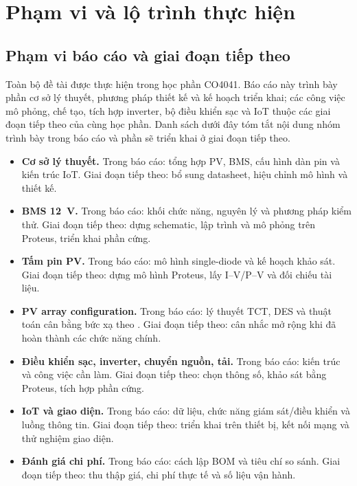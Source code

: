 \section{Phạm vi và lộ trình thực hiện}

\subsection{Phạm vi báo cáo và giai đoạn tiếp theo}

Toàn bộ đề tài được thực hiện trong học phần CO4041. Báo cáo này trình bày phần cơ sở lý thuyết, phương pháp thiết kế và kế hoạch triển khai; các công việc mô phỏng, chế tạo, tích hợp inverter, bộ điều khiển sạc và IoT thuộc các giai đoạn tiếp theo của cùng học phần. Danh sách dưới đây tóm tắt nội dung nhóm trình bày trong báo cáo và phần sẽ triển khai ở giai đoạn tiếp theo.

\begin{itemize}
    \item \textbf{Cơ sở lý thuyết.} Trong báo cáo: tổng hợp PV, BMS, cấu hình dàn pin và kiến trúc IoT. Giai đoạn tiếp theo: bổ sung datasheet, hiệu chỉnh mô hình và thiết kế.
    \item \textbf{BMS 12~V.} Trong báo cáo: khối chức năng, nguyên lý và phương pháp kiểm thử. Giai đoạn tiếp theo: dựng schematic, lập trình và mô phỏng trên Proteus, triển khai phần cứng.
    \item \textbf{Tấm pin PV.} Trong báo cáo: mô hình single-diode và kế hoạch khảo sát. Giai đoạn tiếp theo: dựng mô hình Proteus, lấy I--V/P--V và đối chiếu tài liệu.
    \item \textbf{PV array configuration.} Trong báo cáo: lý thuyết TCT, DES và thuật toán cân bằng bức xạ theo \cite{thanh}. Giai đoạn tiếp theo: cân nhắc mở rộng khi đã hoàn thành các chức năng chính.
    \item \textbf{Điều khiển sạc, inverter, chuyển nguồn, tải.} Trong báo cáo: kiến trúc và công việc cần làm. Giai đoạn tiếp theo: chọn thông số, khảo sát bằng Proteus, tích hợp phần cứng.
    \item \textbf{IoT và giao diện.} Trong báo cáo: dữ liệu, chức năng giám sát/điều khiển và luồng thông tin. Giai đoạn tiếp theo: triển khai trên thiết bị, kết nối mạng và thử nghiệm giao diện.
    \item \textbf{Đánh giá chi phí.} Trong báo cáo: cách lập BOM và tiêu chí so sánh. Giai đoạn tiếp theo: thu thập giá, chi phí thực tế và số liệu vận hành.
\end{itemize}

